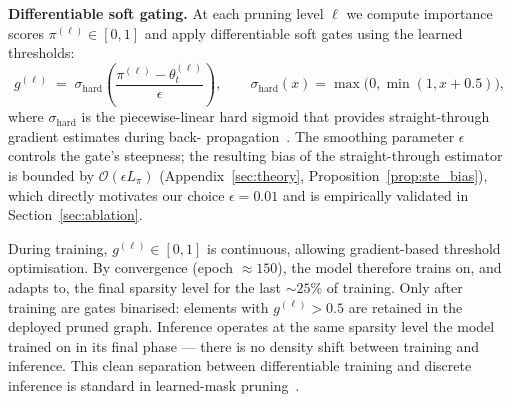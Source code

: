 \documentclass[10pt]{article}
\theoremstyle{plain}
\theoremstyle{definition}
\begin{document}
\textbf{Differentiable soft gating.} At each pruning level $\ell$ we compute importance scores $\pi^{(\ell)}\!\in\![0,1]$ and apply differentiable soft gates using the learned thresholds:
\begin{equation}
g^{(\ell)} \;=\; \sigma_{\mathrm{hard}}\!\left(
\frac{\pi^{(\ell)}-\theta_t^{(\ell)}}{\epsilon}\right),
\qquad
\sigma_{\mathrm{hard}}(x)=\max\!\big(0,\min(1,x+0.5)\big),
\label{eq:unified_gate}
\end{equation}
where $\sigma_{\mathrm{hard}}$ is the piecewise-linear hard sigmoid that provides straight-through gradient estimates during back- propagation~\citep{bengio2013estimating}. The smoothing parameter $\epsilon$ controls the gate's steepness; the resulting bias of the straight-through estimator is bounded by $\mathcal{O}(\epsilon L_\pi)$ (Appendix~\ref{sec:theory}, Proposition~\ref{prop:ste_bias}), which directly motivates our choice $\epsilon=0.01$ and is empirically validated in Section~\ref{sec:ablation}.

During training, $g^{(\ell)}\!\in\![0,1]$ is continuous, allowing gradient-based threshold optimisation. By convergence (epoch $\approx 150$), the model therefore trains on, and adapts to, the final sparsity level for the last $\sim25\%$ of training. Only after training are gates binarised: elements with $g^{(\ell)}>0.5$ are retained in the deployed pruned graph. Inference operates at the same sparsity level the model trained on in its final phase --- there is no density shift between training and inference. This clean separation between differentiable training and discrete inference is standard in learned-mask pruning~\citep{louizos2017learning}.
\end{document}
